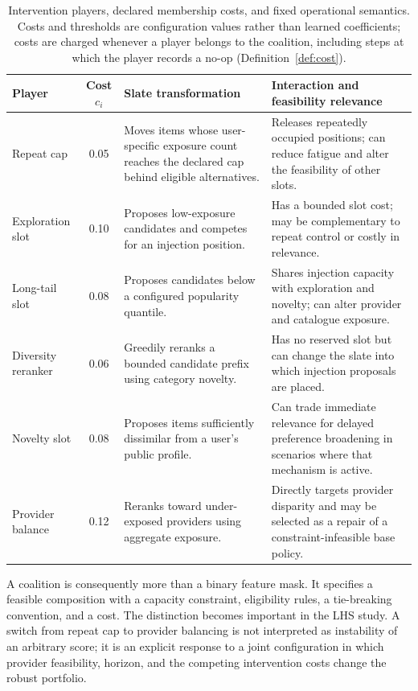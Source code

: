 \documentclass[pdflatex,sn-mathphys-num]{sn-jnl}
\theoremstyle{thmstyleone}
\theoremstyle{thmstyletwo}
\theoremstyle{thmstylethree}
\begin{document}
\begin{table}[t]
\caption{Intervention players, declared membership costs, and fixed operational semantics. Costs and thresholds are configuration values rather than learned coefficients; costs are charged whenever a player belongs to the coalition, including steps at which the player records a no-op (Definition~\ref{def:cost}).}\label{tab:players}
\centering
\small
\setlength{\tabcolsep}{3pt}
\begin{tabularx}{\textwidth}{@{}p{}c X X@{}}
\toprule
Player & Cost $c_i$ & Slate transformation & Interaction and feasibility relevance\\
\midrule
Repeat cap & 0.05 & Moves items whose user-specific exposure count reaches the declared cap behind eligible alternatives. & Releases repeatedly occupied positions; can reduce fatigue and alter the feasibility of other slots.\\
Exploration slot & 0.10 & Proposes low-exposure candidates and competes for an injection position. & Has a bounded slot cost; may be complementary to repeat control or costly in relevance.\\
Long-tail slot & 0.08 & Proposes candidates below a configured popularity quantile. & Shares injection capacity with exploration and novelty; can alter provider and catalogue exposure.\\
Diversity reranker & 0.06 & Greedily reranks a bounded candidate prefix using category novelty. & Has no reserved slot but can change the slate into which injection proposals are placed.\\
Novelty slot & 0.08 & Proposes items sufficiently dissimilar from a user's public profile. & Can trade immediate relevance for delayed preference broadening in scenarios where that mechanism is active.\\
Provider balance & 0.12 & Reranks toward under-exposed providers using aggregate exposure. & Directly targets provider disparity and may be selected as a repair of a constraint-infeasible base policy.\\
\bottomrule
\end{tabularx}
\end{table}

A coalition is consequently more than a binary feature mask. It specifies a feasible composition with a capacity constraint, eligibility rules, a tie-breaking convention, and a cost. The distinction becomes important in the LHS study. A switch from repeat cap to provider balancing is not interpreted as instability of an arbitrary score; it is an explicit response to a joint configuration in which provider feasibility, horizon, and the competing intervention costs change the robust portfolio.
\end{document}
